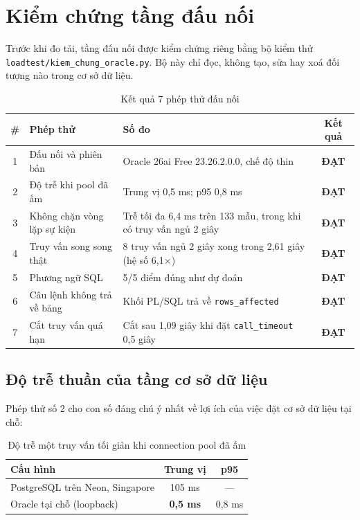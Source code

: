 \documentclass[12pt,a4paper]{article}
\newcommand{\ok}[1]{\textcolor{successgreen}{\bfseries #1}}
\newcommand{\fpath}[1]{\nolinkurl{#1}}
\begin{document}
\clearpage

\section{Kiểm chứng tầng đấu nối}

Trước khi đo tải, tầng đấu nối được kiểm chứng riêng bằng bộ kiểm thử
\fpath{loadtest/kiem_chung_oracle.py}. Bộ này chỉ đọc, không tạo, sửa hay
xoá đối tượng nào trong cơ sở dữ liệu.

\begin{table}[H]
\centering
\caption{Kết quả 7 phép thử đấu nối}
\label{tab:daunoi}
\begin{tabularx}{\textwidth}{clXc}
\toprule
\rowcolor{lightblue}
\# & Phép thử & Số đo & Kết quả\\
\midrule
1 & Đấu nối và phiên bản & Oracle 26ai Free 23.26.2.0.0, chế độ thin & \ok{ĐẠT}\\
2 & Độ trễ khi pool đã ấm & Trung vị 0,5 ms; p95 0,8 ms & \ok{ĐẠT}\\
3 & Không chặn vòng lặp sự kiện & Trễ tối đa 6,4 ms trên 133 mẫu, trong khi có truy vấn ngủ 2 giây & \ok{ĐẠT}\\
4 & Truy vấn song song thật & 8 truy vấn ngủ 2 giây xong trong 2,61 giây (hệ số 6,1$\times$) & \ok{ĐẠT}\\
5 & Phương ngữ SQL & 5/5 điểm đúng như dự đoán & \ok{ĐẠT}\\
6 & Câu lệnh không trả về bảng & Khối PL/SQL trả về \texttt{rows\_affected} & \ok{ĐẠT}\\
7 & Cắt truy vấn quá hạn & Cắt sau 1,09 giây khi đặt \texttt{call\_timeout} 0,5 giây & \ok{ĐẠT}\\
\bottomrule
\end{tabularx}
\end{table}

\subsection{Độ trễ thuần của tầng cơ sở dữ liệu}

Phép thử số 2 cho con số đáng chú ý nhất về lợi ích của việc đặt cơ sở dữ liệu
tại chỗ:

\begin{table}[H]
\centering
\caption{Độ trễ một truy vấn tối giản khi connection pool đã ấm}
\begin{tabularx}{\textwidth}{Xcc}
\toprule
\rowcolor{lightblue}
Cấu hình & Trung vị & p95\\
\midrule
PostgreSQL trên Neon, Singapore & 105 ms & ---\\
Oracle tại chỗ (loopback) & \ok{0,5 ms} & 0,8 ms\\
\bottomrule
\end{tabularx}
\end{table}
\end{document}
